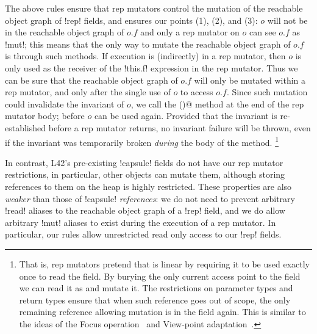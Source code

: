 	
\noindent The above rules ensure that rep mutators control the mutation of the reachable object graph of \Q!rep! fields, and 
 ensures our points (1), (2), and (3):
$o$ will not be in the reachable object graph of $o.f$ and
only a rep mutator on $o$ can see $o.f$ as \Q!mut!; this means that the only way to mutate the reachable object graph of $o.f$ is through such methods. 
If execution is (indirectly) in a rep mutator, then $o$ is only used as the receiver of the \Q!this.f! expression in the rep mutator.
Thus we can be sure that the reachable object graph of $o.f$ will only be mutated within a rep mutator, and only after the single use of $o$ to access $o.f$.
Since such mutation could invalidate the invariant of $o$, we call the \Q@invariant()@ method at the end of the rep mutator body; before $o$ can be used again. Provided that the invariant is re-established before a rep mutator returns, no invariant failure will be thrown, even if the invariant was temporarily broken \emph{during} the body of the method.
\footnote{
That is, rep mutators pretend
  that \Q@this@ is linear by requiring it to be used exactly once to read the \Q@rep@ field. By burying the
  only current access point to the \Q@rep@ field we can read it as \Q@mut@ and mutate it.
  The restrictions on parameter types and return types ensure that when such reference goes out of
  scope, the only remaining reference allowing mutation is in the \Q@rep@ field again.
  This is similar to the ideas of the Focus operation~\cite{DBLP:journals/jot/BarnettDFLS04}
 and View-point adaptation~\cite{DietlEtAl07}.
}

In contrast, L42's pre-existing \Q!capsule! fields do not have our rep mutator restrictions, in particular, other objects can mutate them, although storing references to them on the heap is highly restricted.
These properties are also \emph{weaker} than those of \Q!capsule! \emph{references}: we do not need to prevent arbitrary \Q!read! aliases to the reachable object graph of a \Q!rep! field, and we do allow arbitrary \Q!mut! aliases to exist during the execution of a rep mutator. In particular, our rules allow unrestricted read only access to our \Q!rep! fields.

